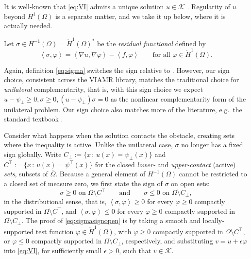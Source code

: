 \documentclass[12pt]{amsart}
\theoremstyle{definition}
\newcommand{\eps}{\epsilon}
\newcommand{\Om}{\Omega}
\newcommand{\psilo}{\psi_\bot}
\newcommand{\psiup}{\psi^\top}
\newcommand{\Cbot}{C_\bot}
\newcommand{\Ctop}{C^\top}
\begin{document}
It is well-known that \eqref{eq:VI} admits a unique solution $u \in \mathcal{K}$ \cite[Theorem 6.2]{KinderlehrerStampacchia1980}.  Regularity of $u$ beyond $H^1(\Om)$ is a separate matter, and we take it up below, where it is actually needed.

Let $\sigma \in H^{-1}(\Om) = \mathring H^1(\Om)^*$ be the \emph{residual functional}
defined by
\begin{equation}
\label{eq:sigma}
  \left< \sigma, \varphi\right> = \left< \nabla u, \nabla \varphi\right> - \left< f, \varphi\right>
  \qquad \text{for all } \varphi \in \mathring H^1(\Om).
\end{equation}

Again, definition \eqref{eq:sigma} switches the sign relative to \cite[formula (1.2)]{NSV03}.  However, our sign choice, consistent across the VIAMR library, matches the traditional choice for \emph{unilateral} complementarity, that is, with this sign choice we expect $u-\psi_\bot\ge 0, \sigma\ge 0, (u-\psi_\bot) \sigma = 0$ as the nonlinear complementarity form of the unilateral problem.  Our sign choice also matches more of the literature, e.g.~the standard textbook \cite{KinderlehrerStampacchia1980}.

Consider what happens when the solution contacts the obstacle, creating sets where the inequality is active.  Unlike the unilateral case, $\sigma$ no longer has a fixed sign globally.  Write $\Cbot := \{x\,:\,u(x) = \psilo(x)\}$ and $\Ctop := \{x\,:\,u(x) = \psiup(x)\}$ for the closed
\emph{lower-} and \emph{upper-contact} (active) \emph{sets}, subsets of $\bar\Om$.  Because a general element of $H^{-1}(\Om)$ cannot be restricted to a closed set of measure zero, we first state the sign of $\sigma$ on open sets:
\begin{equation}
\label{eq:sigmasignopen}
  \sigma \ge 0 \text{ on } \Om \setminus \Ctop \qquad \text{and} \qquad \sigma \le 0 \text{ on } \Om \setminus \Cbot,
\end{equation}
in the distributional sense, that is, $\left<\sigma,\varphi\right> \ge 0$ for every $\varphi \ge 0$ compactly supported in $\Om \setminus \Ctop$, and $\left<\sigma,\varphi\right> \le 0$ for every $\varphi \ge 0$ compactly supported in $\Om \setminus \Cbot$.  The proof of \eqref{eq:sigmasignopen} is by taking a smooth and locally-supported test function $\varphi\in \mathring H^1(\Om)$, with $\varphi\ge 0$ compactly supported in $\Om \setminus \Ctop$, or $\varphi\le 0$ compactly supported in $\Om \setminus \Cbot$, respectively, and substituting $v=u+\eps \varphi$ into \eqref{eq:VI}, for sufficiently small $\eps>0$, such that $v\in\mathcal{K}$.
\end{document}
